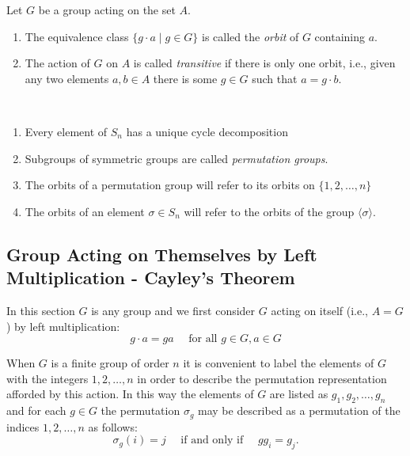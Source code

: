 \documentclass[../main]{subfiles}
\begin{document}
 
 \begin{dfn}
  Let $G$ be a group acting on the set $A$.
  \begin{enumerate}
   \item The equivalence class $\{g\cdot a \mid g\in G\}$ is called the \textit{orbit} of $G$ containing $a$.
   \item The action of $G$ on $A$ is called \textit{transitive} if there is only one orbit, i.e., given any two elements $a,b\in A$ there is some $g\in G$ such that $a=g\cdot b$.
  \end{enumerate}
 \end{dfn}
 
 
 \begin{nt}
  ~\begin{enumerate}
    \item Every element of $S_n$ has a unique cycle decomposition
    \item Subgroups of symmetric groups are called \textit{permutation groups}.
    \item The orbits of a permutation group will refer to its orbits on $\{1,2,\ldots,n\}$
    \item The orbits of an element $\sigma \in S_n$ will refer to the orbits of the group $\langle \sigma \rangle$.
   \end{enumerate}
 \end{nt}
 
 
 \subsection{Group Acting on Themselves by Left Multiplication - Cayley's Theorem}
 

 \begin{nt}
  In this section $G$ is any group and we first consider $G$ acting on itself (i.e., $A=G$) by left multiplication:
  \[g \cdot a=g a \quad \text { for all } g \in G, a \in G\]

When $G$ is a finite group of order $n$ it is convenient to label the elements of $G$ with the integers $1,2, \ldots, n$ in order to describe the permutation representation afforded by this action. In this way the elements of $G$ are listed as $g_1, g_2, \ldots, g_n$ and for each $g \in G$ the permutation $\sigma_g$ may be described as a permutation of the indices $1,2, \ldots, n$ as follows:
\[\sigma_g(i)=j \quad \text { if and only if } \quad g g_i=g_j.\]
 \end{nt}
 
\end{document}
